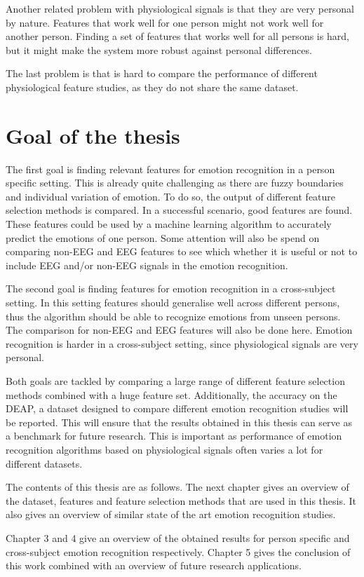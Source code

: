 \npar

Another related problem with physiological signals is that they are very personal by nature. Features that work well for one person might not work well for another person\citep{DEAP}. Finding a set of features that works well for all persons is hard, but it might make the system more robust against personal differences. 

\npar

The last problem is that is hard to compare the performance of different physiological feature studies, as they do not share the same dataset.


\section{Goal of the thesis}
The first goal is finding relevant features for emotion recognition in a person specific setting. This is already quite challenging as there are fuzzy boundaries and individual variation of emotion\citep{emorecoghard}. To do so, the output of different feature selection methods is compared. In a successful scenario, good features are found. These features could be used by a machine learning algorithm to accurately predict the emotions of one person. Some attention will also be spend on comparing non-EEG and EEG features to see which whether it is useful or not to include EEG and/or non-EEG signals in the emotion recognition.

\npar

The second goal is finding features for emotion recognition in a cross-subject setting. In this setting features should generalise well across different persons, thus the algorithm should be able to recognize emotions from unseen persons. The comparison for non-EEG and EEG features will also be done here. Emotion recognition is harder in a cross-subject setting, since physiological signals are very personal\citep{DEAP}.

\npar 

Both goals are tackled by comparing a large range of different feature selection methods combined with a huge feature set. Additionally, the accuracy on the DEAP, a dataset designed to compare different emotion recognition studies\citep{DEAP} will be reported. This will ensure that the results obtained in this thesis can serve as a benchmark for future research. This is important as performance of emotion recognition algorithms based on physiological signals often varies a lot for different datasets\citep{PhytoEm}.

\npar 

The contents of this thesis are as follows. The next chapter gives an overview of the dataset, features and feature selection methods that are used in this thesis. It also gives an overview of similar state of the art emotion recognition studies.
 
\npar
Chapter 3 and 4 give an overview of the obtained results for person specific and cross-subject emotion recognition respectively. Chapter 5 gives the conclusion of this work combined with an overview of future research applications.